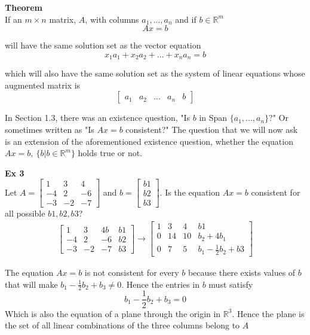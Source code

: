 \documentclass{article}
\begin{document}
  \textbf{Theorem}\\
  If an $ m \times n $ matrix, $ A $, with columns $ a_{1} ,...,a_{n}  $ and if $ b \in \mathbb{R}^{m}$
  \[
    Ax=b
  \]

  will have the same solution set as the vector equation
  \[
    x_{1} a_{1} +x_{2} a_{2} +...+x_{n} a_{n} =b
  \]

  which will also have the same solution set as the system of linear equations whose augmented matrix is
  \[
    \begin{bmatrix}
      a_{1} &a_{2} &... &a_{n} &b
    \end{bmatrix}
  \]
 
  In Section 1.3, there was an existence question, "Is $ b $ in Span $\{a_{1},...,a_{n}  \}$?" Or sometimes written as "Is $ Ax=b $ consistent?" The question that we will now ask is an extension of the aforementioned existence question, whether the equation $ Ax=b ,~\{b|b\in \mathbb{R}^{m} \}$ holds true or not.

  \textbf{Ex 3}\\
  Let $ A=\begin{bmatrix}
    1 &3 &4\\
    -4 &2 &-6\\
    -3 &-2 &-7
  \end{bmatrix} $ and $ b=\begin{bmatrix}
    b1\\
    b2\\
    b3
  \end{bmatrix} $. Is the equation $ Ax=b $ consistent for all possible $ b1,b2,b3 $?
  \[
    \begin{gathered}
    \begin{bmatrix}
      1 &3 &4b &b1\\
      -4 &2 &-6 &b2\\
      -3 &-2 &-7 &b3
    \end{bmatrix} \to
    \begin{bmatrix}
      1 &3 &4 &b1\\
      0 &14 &10 &b_{2}+4b_{1}\\
      0 &7 &5 &b_{1}-\frac{1}{2} b_{2}+b3    
    \end{bmatrix}
    \end{gathered}
  \]

  The equation $ Ax=b $ is not consistent for every $ b $ because there exists values of $ b $ that will make $ b_{1} - \frac{1}{2}b_{2}  + b_{3}  \neq 0 $. Hence the entries in $ b $ must satisfy
  \[
    b_{1} -\frac{1}{2} b_{2} +b_{3}=0 
  \]
  Which is also the equation of a plane through the origin in $ \mathbb{R}^{3}$. Hence the plane is the set of all linear combinations of the three columns belong to $ A $
\end{document}
